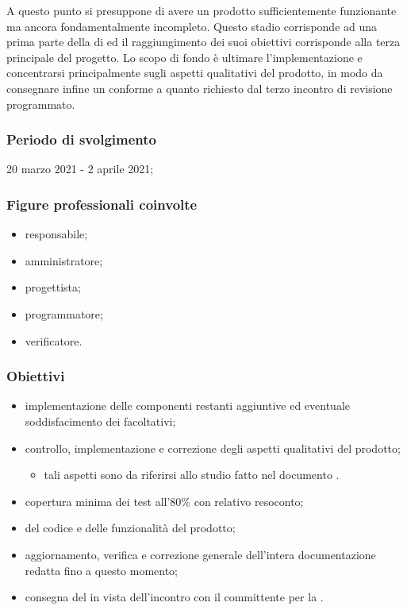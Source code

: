 A questo punto si presuppone di avere un prodotto sufficientemente funzionante ma ancora fondamentalmente incompleto. Questo stadio corrisponde ad una prima parte della  di  ed il raggiungimento dei suoi obiettivi corrisponde alla terza  principale del progetto. Lo scopo di fondo è ultimare l'implementazione e concentrarsi principalmente sugli aspetti qualitativi del prodotto, in modo da consegnare infine un  conforme a quanto richiesto dal terzo incontro di revisione programmato.
        
        \subsubsection{Periodo di svolgimento}
        20 marzo 2021 - 2 aprile 2021;
        
        \subsubsection{Figure professionali coinvolte}
            \begin{itemize}
                \item responsabile;
                \item amministratore;
                \item progettista;
                \item programmatore;
                \item verificatore.
            \end{itemize}

        \subsubsection{Obiettivi}
        \begin{itemize}
            \item implementazione delle componenti restanti aggiuntive ed eventuale soddisfacimento dei  facoltativi;
            \item controllo, implementazione e correzione degli aspetti qualitativi del prodotto;
            \begin{itemize}
                \item tali aspetti sono da riferirsi allo studio fatto nel documento \PdQ{}. %
            \end{itemize}
            \item copertura minima dei test all'80\% con relativo resoconto;
            \item {} del codice e delle funzionalità del prodotto;
            \item aggiornamento, verifica e correzione generale dell'intera documentazione redatta fino a questo momento;
            \item consegna del  in vista dell'incontro con il committente per la \RQ{}.
        \end{itemize}